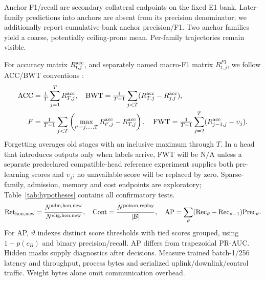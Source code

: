 \documentclass[10pt,a4paper]{article}
\newcommand{\NA}{\mathrm{N/A}}
\begin{document}
Anchor F1/recall are secondary collateral endpoints on the fixed E1 bank. Later-family predictions into anchors are absent from its precision denominator; we additionally report cumulative-bank anchor precision/F1. Two anchor families yield a coarse, potentially ceiling-prone mean. Per-family trajectories remain visible.

For accuracy matrix $R^{\rm acc}_{t,j}$, and separately named macro-F1 matrix $R^{F1}_{t,j}$, we follow ACC/BWT conventions \cite{gem,clmetrics}:
\begin{equation}
\begin{aligned}
\mathrm{ACC}&=\tfrac1T\sum_{j=1}^TR^{\rm acc}_{T,j},\quad
\mathrm{BWT}=\tfrac1{T-1}\sum_{j<T}(R^{\rm acc}_{T,j}-R^{\rm acc}_{j,j}),\\
F&=\tfrac1{T-1}\sum_{j<T}\left(\max_{t'=j,\ldots,T}R^{\rm acc}_{t',j}-R^{\rm acc}_{T,j}\right),\quad
\mathrm{FWT}=\tfrac1{T-1}\sum_{j=2}^T(R^{\rm acc}_{j-1,j}-\upsilon_j).
\end{aligned}
\label{eq:continual}
\end{equation}
Forgetting averages old stages with an inclusive maximum through $T$. In a head that introduces outputs only when labels arrive, FWT will be $\NA$ unless a separate predeclared compatible-head reference experiment supplies both pre-learning scores and $\upsilon_j$; no unavailable score will be replaced by zero. Sparse-family, admission, memory and cost endpoints are exploratory; Table~\ref{tab:hypotheses} contains all confirmatory tests.
\begin{equation}
\mathrm{Ret}_{\rm hon,new}=\frac{N^{\rm adm,hon,new}}{N^{\rm elig,hon,new}},\quad
\mathrm{Cont}=\frac{N^{\rm poison,replay}}{|\mathcal B|},\quad
\mathrm{AP}=\sum_\vartheta(\mathrm{Rec}_\vartheta-\mathrm{Rec}_{\vartheta-1})\mathrm{Prec}_\vartheta.
\label{eq:diagnostics}
\end{equation}
For AP, $\vartheta$ indexes distinct score thresholds with tied scores grouped, using $1-p(c_B)$ and binary precision/recall. AP differs from trapezoidal PR-AUC. Hidden masks supply diagnostics after decisions. Measure trained batch-1/256 latency and throughput, process bytes and serialized uplink/downlink/control traffic. Weight bytes alone omit communication overhead.
\end{document}
